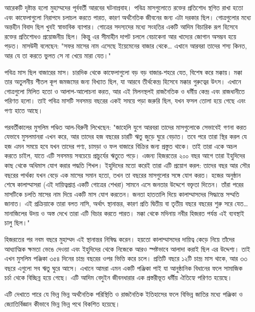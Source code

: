 আরেকটি দৃষ্টান্ত হলো মুহাম্মদের পূর্ববর্তী আরবের ঘটনাপ্রবাহ। পবিত্র মাসগুলোতে রক্তের প্রতিশোধ স্থগিত রাখা হতো এবং কাফেলাগুলো নিরাপদে চলাচল করতে পারত, কারণ অর্থনৈতিক জীবনের জন্য এটা দরকার ছিল। গোত্রগুলোর মধ্যে অন্তহীন বিবাদ ছিল খুবই স্বাভাবিক ব্যাপার। গোত্রের সদস্যদের মধ্যে সংহতির একটি আদিম বিচারিক রূপ হিসেবে রক্তের প্রতিশোধও প্রয়োজনীয় ছিল। কিন্তু এর সীমাহীন দাপট চললে বেচাকেনা আর খাদ্যের জোগান অসম্ভব হয়ে পড়ত। মাসউদী বলেছেন: "সফর মাসের নাম এসেছে ইয়েমেনের বাজার থেকে… এখানে আরবরা তাদের শস্য কিনত, আর যে তা করতে ভুলত সে না খেয়ে মারা যেত।"

পবিত্র মাস ছিল বাজারের মাস। চারদিক থেকে কাফেলাগুলো বড় বড় বাজার-শহরে যেত, বিশেষ করে মক্কায়। মক্কা তার অতুলনীয় শীতল কূপ জমজমের জন্য বিখ্যাত ছিল, যা আরবে তীর্থকেন্দ্র হিসেবে মক্কার গুরুত্বের উৎস। এখানে গোত্রগুলো মিলিত হতো ও আলাপ-আলোচনা করত, আর এই মিলনস্থলই রাজনৈতিক ও ধর্মীয় কেন্দ্র এবং রাজধানীতে পরিণত হলো। তাই পবিত্র মাসটি সবসময় বছরের একই সময়ে পড়া জরুরি ছিল, যখন ফসল তোলা হয়ে গেছে এবং পণ্য হাতে আছে।

পরবর্তীকালের মুসলিম পণ্ডিত আল-বিরুনী লিখেছেন: "জাহেলি যুগে আরবরা তাদের মাসগুলোকে সেভাবেই গণনা করত যেভাবে মুসলমানরা এখন করে, আর তাদের হজ বছরের চারটি ঋতু জুড়ে ঘুরে বেড়াত। তবে পরে তারা স্থির করল যে হজ এমন সময়ে হবে যখন তাদের পণ্য, চামড়া ও ফল বাজারে বিক্রির জন্য প্রস্তুত থাকে। তাই তারা একে অচল করতে চাইল, যাতে এটি সবসময় সবচেয়ে প্রাচুর্যের ঋতুতে পড়ে। এজন্য হিজরতের ২০০ বছর আগে তারা ইহুদিদের কাছ থেকে অধিমাস যোগ করার পদ্ধতি শিখল। ইহুদিদের মতো করেই তারা এটি প্রয়োগ করল: তাদের বছর আর সৌর বছরের পার্থক্য যখন বেড়ে এক মাসের সমান হতো, তখন তা বছরের মাসগুলোর সঙ্গে যোগ করত। হজের অনুষ্ঠান শেষে কালাম্মাসরা (এই দায়িত্বপ্রাপ্ত একটি গোত্রের শেখরা) সামনে এসে জনতার উদ্দেশে বক্তৃতা দিতেন। তাঁরা পরের মাসটিকে চলতি মাসের নাম দিয়ে একটি মাস যোগ করতেন। জনতা হাততালি দিয়ে কালাম্মাসদের সিদ্ধান্তে সম্মতি জানাত। এই প্রক্রিয়াকে তারা বলত নাসি, অর্থাৎ স্থানান্তর, কারণ প্রতি দ্বিতীয় বা তৃতীয় বছরে বছরের শুরু সরে যেত… মানাজিলের উদয় ও অস্ত দেখে তারা এটি বিচার করতে পারত। মক্কা থেকে মদিনায় নবীর হিজরত পর্যন্ত এই ব্যবস্থাই চালু ছিল।"

হিজরতের পর নবম বছরে মুহাম্মদ এই স্থানান্তর নিষিদ্ধ করেন। হয়তো কালাম্মাসদের দায়িত্ব কেড়ে নিয়ে তাঁদের আধ্যাত্মিক ক্ষমতা ভেঙে দেওয়া এবং ইহুদিদের থেকে নিজেকে আরও স্পষ্টভাবে আলাদা করাই ছিল এর উদ্দেশ্য। তাই এখন মুসলিম পঞ্জিকা ৩৫৪ দিনের চান্দ্র বছরের ওপর ভিত্তি করে চলে। প্রতিটি বছরে ১২টি চান্দ্র মাস থাকে, আর ৩৩ বছরে এগুলো সব ঋতু ঘুরে আসে। এখানে আমরা এমন একটি পঞ্জিকা পাই যা আনুষ্ঠানিক বিধানের ফলে সামাজিক চর্চা থেকে বিচ্ছিন্ন হয়ে গেছে। এটি আদিম বেদুইন জীবনধারার এক প্রস্তরীভূত ধর্মীয় ঐতিহ্যে পরিণত হয়েছে।

এটি দেখাতে পারে যে ভিন্ন ভিন্ন অর্থনৈতিক পরিস্থিতি ও রাজনৈতিক ইতিহাসের ফলে বিভিন্ন জাতির মধ্যে পঞ্জিকা ও জ্যোতির্বিজ্ঞান কীভাবে ভিন্ন ভিন্ন পথে বিকশিত হয়েছে।
